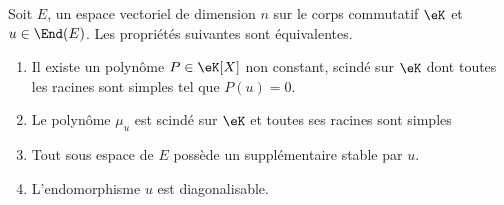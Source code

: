 \begin{theorem}     \label{ThoDigLEQEXR}
    Soit \( E\), un espace vectoriel de dimension \( n\) sur le corps commutatif \( \eK\) et \( u\in\End(E)\). Les propriétés suivantes sont équivalentes.
    \begin{enumerate}
        \item       \label{ItemThoDigLEQEXRi}
            Il existe un polynôme \( P\in\eK[X]\) non constant, scindé sur \(\eK\) dont toutes les racines sont simples tel que \( P(u)=0\).
        \item\label{ItemThoDigLEQEXRii}
            Le polynôme \( \mu_u\) est scindé sur \(\eK\) et toutes ses racines sont simples
        \item\label{ItemThoDigLEQEXRiii}
            Tout sous espace de \( E\) possède un supplémentaire stable par \( u\).
        \item\label{ItemThoDigLEQEXRiv}
            L'endomorphisme \( u\) est diagonalisable.
    \end{enumerate}
    
\end{theorem}


